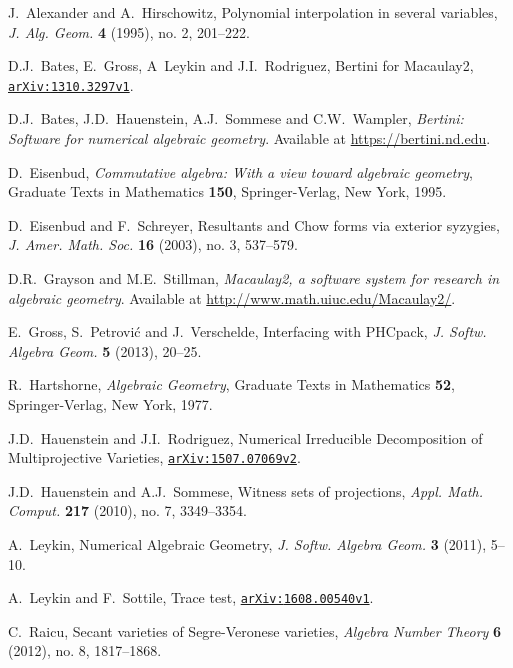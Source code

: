 \documentclass[letter]{amsart}
\theoremstyle{definition}
\begin{document}
\begin{thebibliography}{99}

J.~Alexander and A.~Hirschowitz, 
Polynomial interpolation in several variables, 
{\em J. Alg. Geom.} \textbf{4} (1995), no. 2, 201--222.

D.J.~Bates, E.~Gross, A~Leykin and J.I.~Rodriguez,
Bertini for Macaulay2,
{\href{http://arxiv.org/abs/{1310.3297v1}}{{\tt arXiv:{1310.3297v1}}}}.

D.J.~Bates, J.D.~Hauenstein, A.J.~Sommese and C.W.~Wampler, 
{\em Bertini: Software for numerical algebraic geometry}. 
Available at \url{https://bertini.nd.edu}.

D.~Eisenbud, 
{\em Commutative algebra: With a view toward algebraic geometry},
Graduate Texts in Mathematics \textbf{150},
Springer-Verlag, New York, 1995.

D.~Eisenbud and F.~Schreyer, 
Resultants and Chow forms via exterior syzygies, 
{\em J. Amer.
Math. Soc.} \textbf{16} (2003), no. 3, 537--579.

D.R.~Grayson and M.E.~Stillman, 
{\em Macaulay2, a software system for research in algebraic geometry}. 
Available at \url{http://www.math.uiuc.edu/Macaulay2/}.

E.~Gross, S.~Petrovi\'c and J.~Verschelde,
Interfacing with PHCpack,
{\em J. Softw. Algebra Geom.}
\textbf{5} (2013), 20--25.

R.~Hartshorne, 
{\em Algebraic Geometry},
Graduate Texts in Mathematics \textbf{52},
Springer-Verlag, New York, 1977.

J.D.~Hauenstein and J.I.~Rodriguez,
Numerical Irreducible Decomposition of Multiprojective Varieties,
{\href{http://arxiv.org/abs/{1507.07069v2}}{{\tt arXiv:{1507.07069v2}}}}.

J.D.~Hauenstein and A.J.~Sommese,
Witness sets of projections,
{\em Appl. Math. Comput.}
\textbf{217} (2010), no. 7, 3349--3354.

A.~Leykin,
Numerical Algebraic Geometry,
{\em J. Softw. Algebra Geom.}
\textbf{3} (2011), 5--10.

A.~Leykin and F.~Sottile,
Trace test,
{\href{http://arxiv.org/abs/{1608.00540v1}}{{\tt arXiv:{1608.00540v1}}}}.

C.~Raicu,
Secant varieties of Segre-Veronese varieties,
{\em Algebra Number Theory}
\textbf{6} (2012), no. 8, 1817--1868.


\end{thebibliography}
\end{document}

